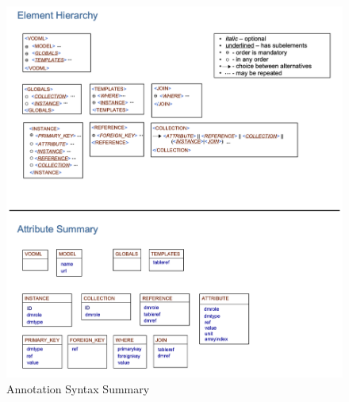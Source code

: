  


  \begin{figure}[h]
    \begin{center}
      \includegraphics[width=\textwidth]{merged-syntax-summary.png}
      \caption{Annotation Syntax Summary}
      \label{fig:summary}
    \end{center}
  \end{figure}
